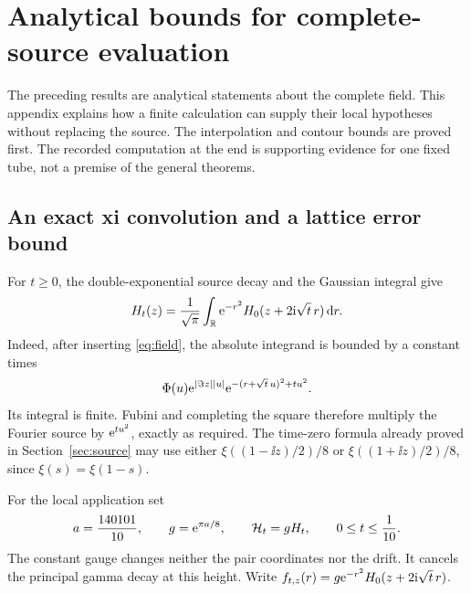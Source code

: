 \section{Analytical bounds for complete-source evaluation}
\label{sec:gt-source-certification}

The preceding results are analytical statements about the complete field.
This appendix explains how a finite calculation can supply their local
hypotheses without replacing the source. The interpolation and contour
bounds are proved first. The recorded computation at the end is supporting
evidence for one fixed tube, not a premise of the general theorems.

\subsection{An exact xi convolution and a lattice error bound}

For \(t\ge0\), the double-exponential source decay and the Gaussian integral
give
\begin{equation}
 H_t(z)=\frac1{\sqrt\pi}\int_{\mathbb R}\mathrm e^{-r^2}
                     H_0(z+2\mathrm i\sqrt t\,r)\,\mathrm d r .
 \label{eq:gt-xi-convolution}
\end{equation}
Indeed, after inserting \eqref{eq:field}, the absolute integrand is bounded
by a constant times
\[
 \Phi(u)\mathrm e^{|\Im z||u|}\mathrm e^{-(r+\sqrt t\,u)^2+tu^2}.
\]
Its integral is finite. Fubini and completing the square therefore
multiply the Fourier source by \(\mathrm e^{tu^2}\), exactly as required.
The time-zero formula already proved in Section~\ref{sec:source} may use
either \(\xi((1-\ii z)/2)/8\) or \(\xi((1+\ii z)/2)/8\), since
\(\xi(s)=\xi(1-s)\).

For the local application set
\[
 a=\frac{140101}{10},\qquad g=\mathrm e^{\pi a/8},\qquad
 \mathcal H_t=gH_t,\qquad 0\le t\le\frac1{10}.
\]
The constant gauge changes neither the pair coordinates nor the drift.
It cancels the principal gamma decay at this height. Write
\(f_{t,z}(r)=g\mathrm e^{-r^2}H_0(z+2\mathrm i\sqrt t\,r)\).

